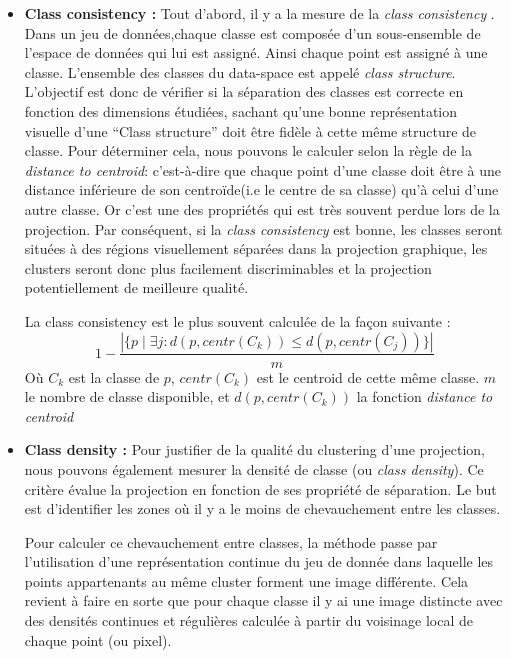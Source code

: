 \begin{itemize}
\item
\textbf{Class consistency : }
\smallskip
Tout d'abord, il y a la mesure de la \textit{class consistency} \cite{bertini2011Class-Consistency}.
 Dans un jeu de données,chaque classe est composée d’un sous-ensemble de l'espace de données qui lui est assigné. Ainsi
chaque point est assigné à une classe. L’ensemble des classes du data-space est appelé
\textit{class structure}.
L'objectif est donc de vérifier si la séparation des classes est correcte en fonction des
dimensions étudiées, sachant qu’une bonne représentation visuelle d’une “Class structure”
doit être fidèle à cette même structure de classe. Pour déterminer cela, nous pouvons le
calculer selon la règle de la \textit{distance to centroid}: c’est-à-dire que
chaque point d’une classe doit être à une distance inférieure de son centroïde(i.e le centre de sa
classe) qu’à celui d’une autre classe.
Or c’est une des propriétés qui est très souvent perdue lors de la projection.
Par conséquent, si la \textit{class consistency} est bonne, les classes seront situées à des régions
visuellement séparées dans la projection graphique, les clusters seront donc plus
facilement discriminables et la projection potentiellement de meilleure qualité.

La class consistency est le plus souvent calculée de la façon suivante : 
\[ 1- \frac {| \{ p \mid \exists j : d(p,centr(C_k))\leq d(p,centr(C_j)) \} |}{m}\]
Où $C_k$ est la classe de $p$, $centr(C_k)$ est le centroid de cette même classe. $m$ le nombre de classe disponible, et $d(p, centr(C_k))$ la fonction \textit{distance to centroid} 
\item
\textbf{Class density : }
\smallskip
 Pour justifier de la qualité du clustering d’une projection, nous pouvons également
mesurer la densité de classe (ou \textit{class density}).
Ce critère évalue la projection en fonction de ses propriété de séparation. Le but est
d'identifier les zones où il y a le moins de chevauchement entre les classes.


Pour calculer ce chevauchement entre classes, la méthode passe par l'utilisation d'une représentation continue du jeu de donnée dans laquelle les points
appartenants au même cluster forment une image différente. Cela revient à faire en sorte que pour chaque classe il y ai une image distincte avec
des densités continues et régulières calculée à partir du voisinage local de chaque point (ou pixel).


\end{itemize}
